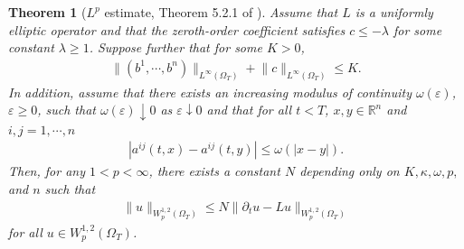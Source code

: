 \documentclass[reqno,11pt,final]{amsart}
\theoremstyle{plain}
\newtheorem{theorem}{Theorem}
\numberwithin{equation}{section}
\numberwithin{theorem}{section}
\begin{document}
\begin{theorem}[$L^p$ estimate, Theorem 5.2.1 of {\cite{Ell_Krylov_2008}}]\label{L^p}  Assume that $L$ is a uniformly elliptic operator and that the zeroth-order coefficient satisfies $c\le -\lambda$ for some constant $\lambda\ge1$. Suppose further that for some $K>0$,
\begin{align*}
\lVert (b^1,\cdots, b^n)\rVert_{L^\infty(\Omega_T)} + \lVert c\rVert_{L^\infty(\Omega_T)} \le K.
\end{align*}In addition, assume that there exists an increasing modulus of continuity $\omega(\varepsilon)$, $\varepsilon\ge0$, such that $\omega(\varepsilon)\downarrow 0$ as $\varepsilon\downarrow0$ and that for all $t<T$, $x,y\in\mathbb{R}^n$ and $i,j=1,\cdots,n$
\begin{align*}
|a^{ij}(t,x) - a^{ij}(t,y)| \le \omega(|x-y|).
\end{align*}Then, for any $1<p<\infty$, there exists a constant $N$ depending only on $K,\kappa,\omega, p,$ and $n$ such that
\begin{align*}
\lVert u\rVert_{W^{1,2}_p(\Omega_T)} \le N \lVert \partial_tu - Lu \rVert_{W^{1,2}_p(\Omega_T)}
\end{align*}for all $u\in W^{1,2}_p(\Omega_T)$.
\end{theorem}
\end{document}
